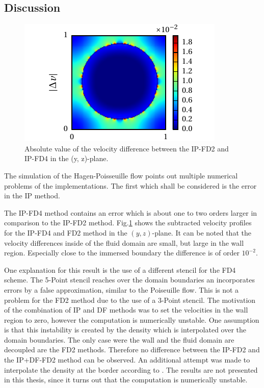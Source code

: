 \clearpage

\subsection{Discussion}

\label{sec:hpflow_discussion}

\begin{figure}[!bp]
  \begin{minipage}[c]{0.4\textwidth}
      \centering
      \includegraphics{gfx/immersed_boundary/hpflow/discussion/vzdiff.pdf}
  \end{minipage}
  \begin{minipage}[c]{0.6\textwidth}
      \caption{Absolute value of the velocity difference between the IP-FD2 and IP-FD4 in the (y, z)-plane.
      \label{valid:hpflow_velodiff_discussion}
      }
  \end{minipage}
\end{figure}

The simulation of the Hagen-Poisseuille flow points out multiple numerical problems of the
implementations.
The first which shall be considered is the error in the IP method.

The IP-FD4 method contains an error which is about one to two orders larger in comparison to the  IP-FD2 method.
Fig.\ref{valid:hpflow_velodiff_discussion} shows the subtracted velocity profiles for the IP-FD4 and FD2 method in the $(y, z)$-plane.
It can be noted that the velocity differences inside of the fluid domain are small, but large in the wall region.
Especially close to the immersed boundary the difference  is of order $10^{-2}$.

One explanation for this result is the use of a different stencil for the FD4 scheme.
The 5-Point stencil reaches over the domain boundaries an incorporates errors by a false approximation, similar to the Poiseuille flow.
This is not a problem for the FD2 method due to the use of a 3-Point stencil.
The motivation of the combination of IP and DF methods was to set the velocities in the wall region to zero,
however the computation is numerically unstable.
One assumption is that this instability is created by the density which is interpolated over the domain boundaries.
The only case were the wall and the fluid domain are decoupled are the FD2 methods.
Therefore no difference between the IP-FD2 and the IP+DF-FD2 method can be observed.
An additional attempt was made to interpolate the density at the border according to \citep{Gilmanov2003}.
The results are not presented in this thesis, since it turns out that the computation is numerically unstable.

